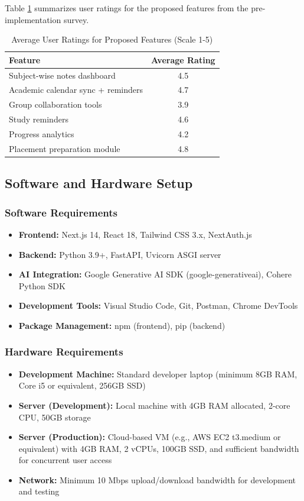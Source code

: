 \documentclass[12pt]{article}
\begin{document}
Table \ref{tab:feature_ratings} summarizes user ratings for the proposed features from the pre-implementation survey.

\begin{table}[htbp]
\caption{Average User Ratings for Proposed Features (Scale 1-5)}
\label{tab:feature_ratings}
\begin{center}
\begin{tabular}{|l|c|}
\hline
\textbf{Feature} & \textbf{Average Rating} \\
\hline
Subject-wise notes dashboard & 4.5 \\
\hline
Academic calendar sync + reminders & 4.7 \\
\hline
Group collaboration tools & 3.9 \\
\hline
Study reminders & 4.6 \\
\hline
Progress analytics & 4.2 \\
\hline
Placement preparation module & 4.8 \\
\hline
\end{tabular}
\end{center}
\end{table}

\subsection{Software and Hardware Setup}
\subsubsection{Software Requirements}
\begin{itemize}
    \item \textbf{Frontend:} Next.js 14, React 18, Tailwind CSS 3.x, NextAuth.js
    \item \textbf{Backend:} Python 3.9+, FastAPI, Uvicorn ASGI server
    \item \textbf{AI Integration:} Google Generative AI SDK (google-generativeai), Cohere Python SDK
    \item \textbf{Development Tools:} Visual Studio Code, Git, Postman, Chrome DevTools
    \item \textbf{Package Management:} npm (frontend), pip (backend)
\end{itemize}

\subsubsection{Hardware Requirements}
\begin{itemize}
    \item \textbf{Development Machine:} Standard developer laptop (minimum 8GB RAM, Core i5 or equivalent, 256GB SSD)
    \item \textbf{Server (Development):} Local machine with 4GB RAM allocated, 2-core CPU, 50GB storage
    \item \textbf{Server (Production):} Cloud-based VM (e.g., AWS EC2 t3.medium or equivalent) with 4GB RAM, 2 vCPUs, 100GB SSD, and sufficient bandwidth for concurrent user access
    \item \textbf{Network:} Minimum 10 Mbps upload/download bandwidth for development and testing
\end{itemize}
\end{document}
